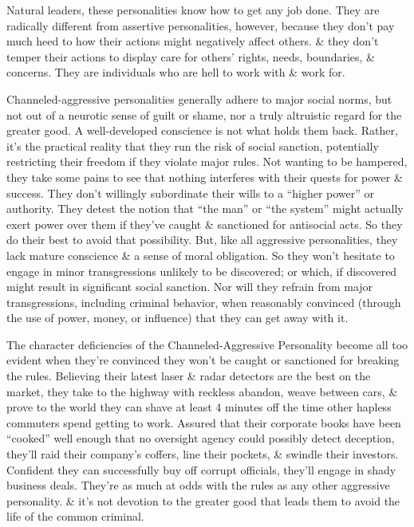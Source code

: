 \documentclass{article}
\numberwithin{equation}{section}
\begin{document}
Natural leaders, these personalities know how to get any job done. They are radically different from assertive personalities, however, because they don't pay much heed to how their actions might negatively affect others. \& they don't temper their actions to display care for others' rights, needs, boundaries, \& concerns. They are individuals who are hell to work with \& work for.

Channeled-aggressive personalities generally adhere to major social norms, but not out of a neurotic sense of guilt or shame, nor a truly altruistic regard for the greater good. A well-developed conscience is not what holds them back. Rather, it's the practical reality that they run the risk of social sanction, potentially restricting their freedom if they violate major rules. Not wanting to be hampered, they take some pains to see that nothing interferes with their quests for power \& success. They don't willingly subordinate their wills to a ``higher power'' or authority. They detest the notion that ``the man'' or ``the system'' might actually exert power over them if they've caught \& sanctioned for antisocial acts. So they do their best to avoid that possibility. But, like all aggressive personalities, they lack mature conscience \& a sense of moral obligation. So they won't hesitate to engage in minor transgressions unlikely to be discovered; or which, if discovered might result in significant social sanction. Nor will they refrain from major transgressions, including criminal behavior, when reasonably convinced (through the use of power, money, or influence) that they can get away with it.

The character deficiencies of the Channeled-Aggressive Personality become all too evident when they're convinced they won't be caught or sanctioned for breaking the rules. Believing their latest laser \& radar detectors are the best on the market, they take to the highway with reckless abandon, weave between cars, \& prove to the world they can shave at least 4 minutes off the time other hapless commuters spend getting to work. Assured that their corporate books have been ``cooked'' well enough that no oversight agency could possibly detect deception, they'll raid their company's coffers, line their pockets, \& swindle their investors. Confident they can successfully buy off corrupt officials, they'll engage in shady business deals. They're as much at odds with the rules as any other aggressive personality. \& it's not devotion to the greater good that leads them to avoid the life of the common criminal.
\end{document}
